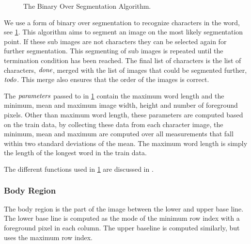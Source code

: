 \newcommand{\body}{\ensuremath{\t{body}}\xspace}
\newcommand{\strokewidth}{\ensuremath{\t{stroke\_w}}\xspace}
\newcommand{\segmentationpoints}{\ensuremath{\t{sps}}\xspace}
\newcommand{\segmentationpoint}{\ensuremath{\t{sp}}\xspace}
\newcommand{\image}{\ensuremath{\t{image}}\xspace}
\newcommand{\subimage}{\ensuremath{\t{sub\_image}}\xspace}
\newcommand{\leftsubimage}{\ensuremath{\t{left}}\xspace}
\newcommand{\rightsubimage}{\ensuremath{\t{right}}\xspace}
\newcommand{\segmentfurther}{\ensuremath{\t{todo}}\xspace}
\newcommand{\characters}{\ensuremath{\t{done}}\xspace}
\newcommand{\parameters}{\ensuremath{\t{parameters}}\xspace}

\begin{figure}
	
	\caption{The Binary Over Segmentation Algorithm.}
	\label{alg:method:segmentation:algorithm}
\end{figure}

We use a form of binary over segmentation to recognize characters in the word, see \cref{alg:method:segmentation:algorithm}. This algorithm aims to segment an image on the most likely segmentation point. If these sub images are not characters they can be selected again for further segmentation. This segmenting of sub images is repeated until the termination condition has been reached. The final list of characters is the list of characters, \characters, merged with the list of images that could be segmented further, \segmentfurther. This merge also ensures that the order of the images is correct.

The \parameters passed to  in \cref{alg:method:segmentation:algorithm} contain the maximum word length and the minimum, mean and maximum image width, height and number of foreground pixels. Other than maximum word length, these parameters are computed based on the train data, by collecting these data from each character image, the minimum, mean and maximum are computed over all measurements that fall within two standard deviations of the mean. The maximum word length is simply the length of the longest word in the train data.

The different functions used in \cref{alg:method:segmentation:algorithm} are discussed in .

\subsubsection{Body Region}
\label{sss:method:segmentaton:bodyregion}
	The body region is the part of the image between the lower and upper base line. The lower base line is computed as the mode of the minimum row index with a foreground pixel in each column. The upper baseline is computed similarly, but uses the maximum row index.

